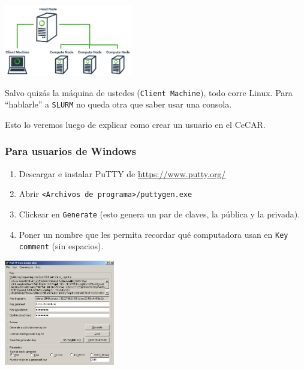 \documentclass[]{beamer}
\begin{document}
\begin{frame}
\begin{center}
\includegraphics[width=15em]{cluster_diagram.png}
\end{center}
Salvo quizás la máquina de ustedes (\Verb=Client Machine=), todo corre Linux. Para ``hablarle'' a \Verb=SLURM= no queda otra que saber usar una consola. 
\vspace{1em}
\pause

Esto lo veremos luego de explicar como crear un usuario en el CeCAR.
\end{frame}

\begin{frame}
\frametitle{Para usuarios de Windows}
\begin{enumerate}
  \item Descargar e instalar PuTTY de \url{https://www.putty.org/}
  \item Abrir \Verb=<Archivos de programa>/puttygen.exe=
  \item Clickear en \Verb=Generate= (esto genera un par de claves, la pública y la privada).
  \item Poner un nombre que les permita recordar qué computadora usan en \Verb=Key comment= (sin espacios).
\end{enumerate}
  \begin{center}
  \includegraphics[width=13em]{./puttygen}
  \end{center} 
\end{frame}
\end{document}
